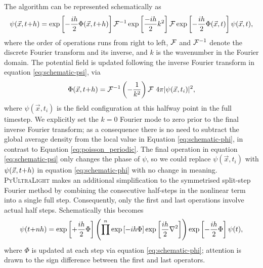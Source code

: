 \documentclass[a4paper,11pt]{article}
\newcommand{\PyUltraLight}{\textsc{PyUltraLight}\xspace}
\begin{document}
The algorithm can be represented schematically as
\begin{equation}\label{eq:schematic-psi}
    \psi(\vec{x},t\hspace*{-.2em}+\hspace*{-.2em}h)=\operatorname{exp}\left[-\frac{ih}{2}\Phi(\vec{x},t\hspace*{-.2em}+\hspace*{-.2em}h)\right]\CMcal{F}^{-1} \operatorname{exp}\left[\frac{-ih}{2}k^2\right]\CMcal{F}\operatorname{exp}\left[-\frac{ih}{2}\Phi(\vec{x},t)\right]\psi(\vec{x},t),
\end{equation}
where the order of operations runs from right to left, $\CMcal{F}$ and $\CMcal{F}^{-1}$ denote the discrete Fourier transform and its inverse, and $k$ is the wavenumber in the Fourier domain. The potential field is updated following the inverse Fourier transform in equation \ref{eq:schematic-psi}, via
%
\begin{equation}\label{eq:schematic-phi}
    \Phi(\vec{x},t\hspace*{-.2em}+\hspace*{-.2em}h)=\CMcal{F}^{-1}\left(-\frac{1}{k^2}\right)\CMcal{F}\ 4\pi\vert\psi(\vec{x},t_{i})\vert^2,
\end{equation}
%
where $\psi(\vec{x},t_{i})$ is the field configuration at this halfway point in the full timestep. We explicitly set the $k=0$ Fourier mode to zero prior to the final inverse Fourier transform; as a consequence there is no need to subtract the global average density from the local value in Equation \ref{eq:schematic-phi}, in contrast to Equation \ref{eq:poisson_periodic}. The final operation in equation \ref{eq:schematic-psi}  only changes the phase of  $\psi$, so we could replace $\psi(\vec{x},t_{i})$ with $\psi(\vec{x},t\hspace*{-.2em}+\hspace*{-.2em}h)$ in equation \ref{eq:schematic-phi} with no change in meaning. \PyUltraLight makes an additional simplification to the symmetrised split-step Fourier method by combining the consecutive half-steps in the nonlinear term into a single full step. Consequently, only the first and last operations involve actual half steps. Schematically this becomes 
%
\begin{equation}
    \psi(t\hspace*{-.2em}+\hspace*{-.2em}nh)=\operatorname{exp}\left[+\frac{ih}{2}\Phi\right]\left(\prod^n\operatorname{exp}\left[-ih\Phi\right]\operatorname{exp}\left[\frac{ih}{2}\nabla^2\right]\right)\operatorname{exp}\left[-\frac{ih}{2}\Phi\right]\psi(t),
\end{equation}
%
where  $\Phi$  is updated at each step via equation \ref{eq:schematic-phi}; attention is drawn to the sign difference between the first and last operators.
\end{document}
